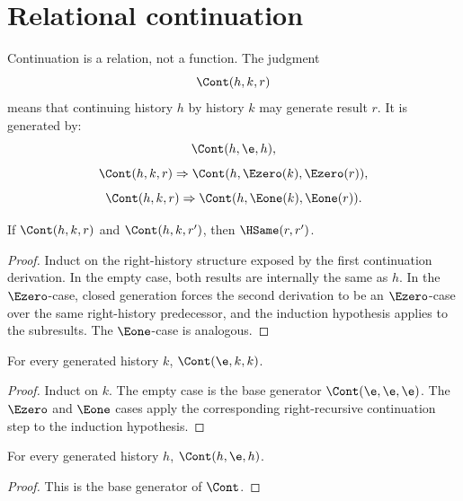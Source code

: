 \section{Relational continuation}

\begin{definition}
Continuation is a relation, not a function.  The judgment
$$
\Cont(h,k,r)
$$
means that continuing history $h$ by history $k$ may generate result $r$.  It is generated by:
$$
\Cont(h,\e,h),
$$
$$
\Cont(h,k,r)\Rightarrow \Cont(h,\Ezero(k),\Ezero(r)),
$$
$$
\Cont(h,k,r)\Rightarrow \Cont(h,\Eone(k),\Eone(r)).
$$
\end{definition}

\begin{theorem}
\label{thm:continuation-determinacy}
If $\Cont(h,k,r)$ and $\Cont(h,k,r')$, then $\HSame(r,r')$.
\end{theorem}
\begin{proof}
Induct on the right-history structure exposed by the first continuation derivation.  In the empty case, both results are internally the same as $h$.  In the $\Ezero$-case, closed generation forces the second derivation to be an $\Ezero$-case over the same right-history predecessor, and the induction hypothesis applies to the subresults.  The $\Eone$-case is analogous.
\end{proof}

\begin{theorem}
\label{thm:continuation-left-unit-proof-sprint}
For every generated history $k$, $\Cont(\e,k,k)$.
\end{theorem}
\begin{proof}
Induct on $k$.  The empty case is the base generator $\Cont(\e,\e,\e)$.  The $\Ezero$ and $\Eone$ cases apply the corresponding right-recursive continuation step to the induction hypothesis.
\end{proof}

\begin{theorem}
\label{thm:continuation-right-unit}
For every generated history $h$, $\Cont(h,\e,h)$.
\end{theorem}
\begin{proof}
This is the base generator of $\Cont$.
\end{proof}

